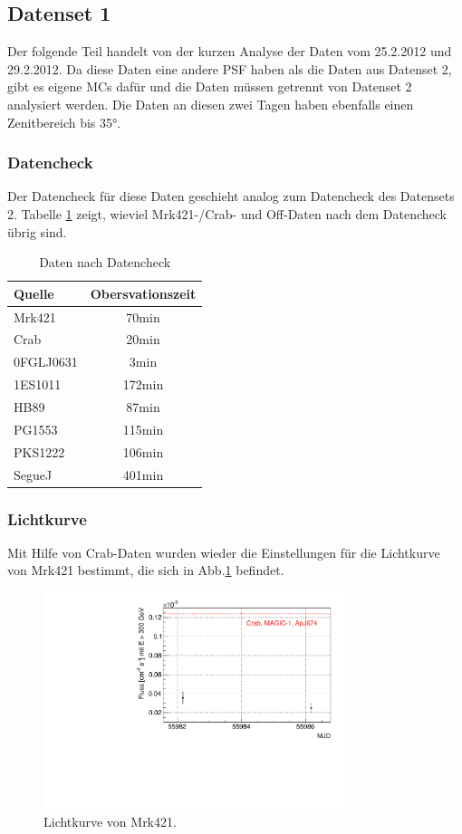 \subsection{Datenset 1}
\label{subsec:Datenset_1}
Der folgende Teil handelt von der kurzen Analyse der Daten vom 25.2.2012 und 29.2.2012.
Da diese Daten eine andere PSF haben als die Daten aus Datenset 2, gibt es eigene MCs dafür und die Daten müssen getrennt von Datenset 2 analysiert werden.
Die Daten an diesen zwei Tagen haben ebenfalls einen Zenitbereich bis 35°.

\subsubsection{Datencheck}
Der Datencheck für diese Daten geschieht analog zum Datencheck des Datensets 2. 
Tabelle \ref{tab:Datenset1} zeigt, wieviel Mrk421-/Crab- und Off-Daten nach dem Datencheck übrig sind.

\begin{table}[!h]
\centering
\caption{Daten nach Datencheck}
\label{tab:Datenset1}
\begin{tabular}{lc}
  \toprule
  Quelle & Obersvationszeit\\
  \midrule
  \midrule
  Mrk421 & 70min\\
  \midrule
  Crab & 20min\\
  \midrule
  0FGLJ0631 & 3min \\
  1ES1011 & 172min \\
  HB89 & 87min \\
  PG1553 & 115min \\
  PKS1222 & 106min \\
  SegueJ & 401min \\
  \bottomrule
  \bottomrule
\end{tabular}
\end{table}

\subsubsection{Lichtkurve}
Mit Hilfe von Crab-Daten wurden wieder die Einstellungen für die Lichtkurve von Mrk421 bestimmt, die sich in Abb.\ref{Datenset1_LC_Mrk421} befindet.

\begin{figure}
    \centering
    \includegraphics[width=0.8\textwidth]{./Plots/04_MrkAnalyse/Datenset1/Datenset1_LC_Mrk421.pdf}
    \caption{Lichtkurve von Mrk421.}
    \label{Datenset1_LC_Mrk421}
\end{figure}

